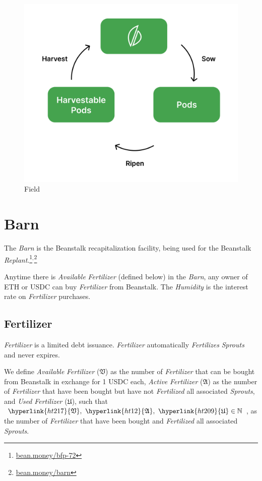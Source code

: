 \documentclass[tikz]{article}
\newcommand{\term}[1]{\textsl{#1}}
\begin{document}
\begin{figure}[h!]
    \centering
    \includegraphics[scale=.14]{Figure2}
    \vspace*{-5mm}
    \caption{Field}
    \label{fig 2}
\end{figure}

\section{Barn}
The \term{Barn} is the Beanstalk recapitalization facility, being used for the Beanstalk \term{Replant}.\footnote{\href{https://bean.money/bfp-72}{bean.money/bfp-72}}$^{,}$\footnote{\href{https://bean.money/barn}{bean.money/barn}}

Anytime there is \term{Available} \term{Fertilizer} (defined below) in the \term{Barn}, any owner of ETH or USDC can buy \term{Fertilizer} from Beanstalk. The \term{Humidity} is the interest rate on \term{Fertilizer} purchases.

\subsection{Fertilizer}
\term{Fertilizer} is a limited debt issuance. \term{Fertilizer} automatically \term{Fertilizes} \term{Sprouts} and never expires.

We define \term{Available} \term{Fertilizer} (\hyperlink{ht217}{$\mathfrak{V}$}) as the number of \term{Fertilizer} that can be bought from Beanstalk in exchange for 1 USDC each, \term{Active} \term{Fertilizer} (\hyperlink{ht12}{$\mathfrak{A}$}) as the number of \term{Fertilizer} that have been bought but have not \term{Fertilized} all associated \term{Sprouts}, and \term{Used} \term{Fertilizer} (\hyperlink{ht209}{$\mathfrak{U}$}), such that $\hyperlink{ht217}{\mathfrak{V}},\ \hyperlink{ht12}{\mathfrak{A}},\ \hyperlink{ht209}{\mathfrak{U}} \in \mathbb{N}$, as the number of \term{Fertilizer} that have been bought and \term{Fertilized} all associated \term{Sprouts}. 
\end{document}
